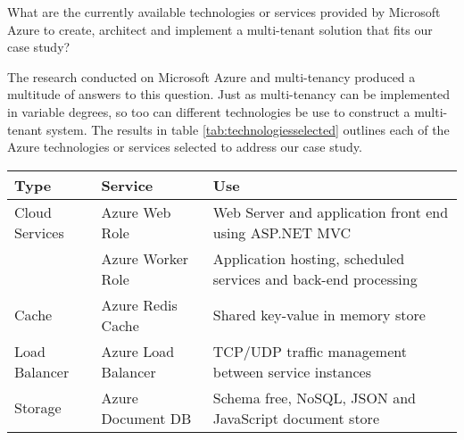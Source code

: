 \begin{tcolorbox}[title=Research Question 2]
What are the currently available technologies or services provided by Microsoft Azure to create, architect and implement a multi-tenant solution that fits our case study?
\end{tcolorbox}

The research conducted on Microsoft Azure and multi-tenancy produced a multitude of answers to this question. Just as multi-tenancy can be implemented in variable degrees, so too can different technologies be use to construct a multi-tenant system. The results in table \ref{tab:technologiesselected} outlines each of the Azure technologies or services selected to address our case study.

\begin{table}[htp]
\centering
\begin{tabularx}{\textwidth}{|p{1.9cm}|p{3cm}|X|}
\hline
\rowcolor[HTML]{EFEFEF} 
Type           & Service                 & Use                                                                                                                                                                                                   \\ \hline
Cloud Services & Azure Web Role          & Web Server and application front end using ASP.NET MVC                                                                                                                                                \\\hline
               & Azure Worker Role       & Application hosting, scheduled services and back-end processing                                                                                                                                       \\\hline
Cache          & Azure Redis Cache       & Shared key-value in memory store                                                                                                                                                                      \\\hline
Load Balancer  & Azure Load Balancer     & TCP/UDP traffic management between service instances                                                                                                                                                  \\\hline
Storage        & Azure Document DB       & Schema free, NoSQL, JSON and JavaScript document store                                                                                                                                                \\\hline

\end{tabularx}
\end{table}
